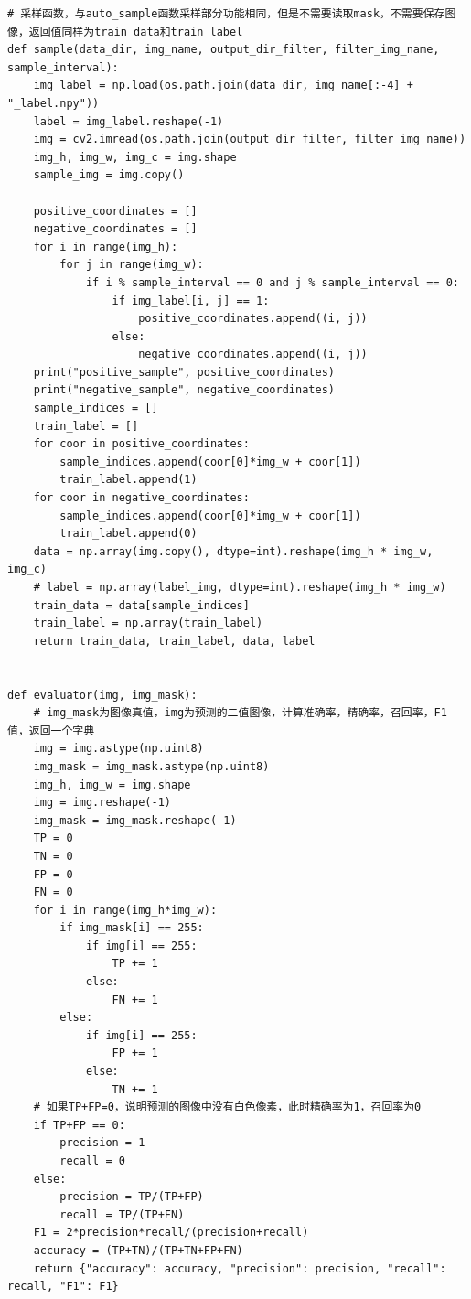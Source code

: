 \documentclass[12pt,hyperref,a4paper,UTF8]{ctexart}
\begin{document}
{{\begin{mdframed}[style=codebox]
\begin{lstlisting}
# 采样函数，与auto_sample函数采样部分功能相同，但是不需要读取mask，不需要保存图像，返回值同样为train_data和train_label
def sample(data_dir, img_name, output_dir_filter, filter_img_name, sample_interval):
    img_label = np.load(os.path.join(data_dir, img_name[:-4] + "_label.npy"))
    label = img_label.reshape(-1)
    img = cv2.imread(os.path.join(output_dir_filter, filter_img_name))
    img_h, img_w, img_c = img.shape
    sample_img = img.copy()

    positive_coordinates = []
    negative_coordinates = []
    for i in range(img_h):
        for j in range(img_w):
            if i % sample_interval == 0 and j % sample_interval == 0:
                if img_label[i, j] == 1:
                    positive_coordinates.append((i, j))
                else:
                    negative_coordinates.append((i, j))
    print("positive_sample", positive_coordinates)
    print("negative_sample", negative_coordinates)
    sample_indices = []
    train_label = []
    for coor in positive_coordinates:
        sample_indices.append(coor[0]*img_w + coor[1])
        train_label.append(1)
    for coor in negative_coordinates:
        sample_indices.append(coor[0]*img_w + coor[1])
        train_label.append(0)
    data = np.array(img.copy(), dtype=int).reshape(img_h * img_w, img_c)
    # label = np.array(label_img, dtype=int).reshape(img_h * img_w)
    train_data = data[sample_indices]
    train_label = np.array(train_label)
    return train_data, train_label, data, label


def evaluator(img, img_mask):
    # img_mask为图像真值，img为预测的二值图像，计算准确率，精确率，召回率，F1值，返回一个字典
    img = img.astype(np.uint8)
    img_mask = img_mask.astype(np.uint8)
    img_h, img_w = img.shape
    img = img.reshape(-1)
    img_mask = img_mask.reshape(-1)
    TP = 0
    TN = 0
    FP = 0
    FN = 0
    for i in range(img_h*img_w):
        if img_mask[i] == 255:
            if img[i] == 255:
                TP += 1
            else:
                FN += 1
        else:
            if img[i] == 255:
                FP += 1
            else:
                TN += 1
    # 如果TP+FP=0，说明预测的图像中没有白色像素，此时精确率为1，召回率为0
    if TP+FP == 0:
        precision = 1
        recall = 0
    else:
        precision = TP/(TP+FP)
        recall = TP/(TP+FN)
    F1 = 2*precision*recall/(precision+recall)
    accuracy = (TP+TN)/(TP+TN+FP+FN)
    return {"accuracy": accuracy, "precision": precision, "recall": recall, "F1": F1}
\end{lstlisting}
\end{mdframed}

}}
\end{document}
